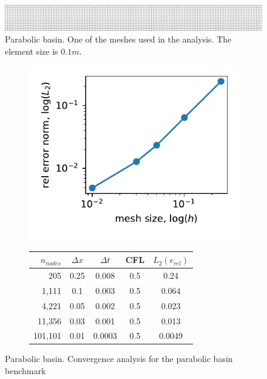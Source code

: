 \documentclass[a4paper,12pt]{article}
\begin{document}
\begin{figure}
    \includegraphics[width=\textwidth]{img/par/mesh_0.1.pdf}
    \caption{Parabolic basin. One of the meshes used in the analysis. The element size is $0.1m$.}
    \label{parabola_mesh}
\end{figure}

\begin{figure}[H]
\begin{subfigure}{0.4\textwidth}
    \includegraphics[width=\textwidth]{img/par/conv_1.pdf}    
\end{subfigure}
\hfill
\begin{subfigure}{0.58\textwidth}
    \begin{tabular}{>{\small}rcccc} \hline
    $n_{nodes}$ & $\Delta x$ & $\Delta t$ & CFL & $L_2(e_{rel})$ \\ \hline
205 & 0.25 & 0.008 & 0.5 & 0.24 \\
1,111 & 0.1 & 0.003 & 0.5 & 0.064 \\
4,221 & 0.05 & 0.002 & 0.5 & 0.023 \\
11,356 & 0.03 & 0.001 & 0.5 & 0.013 \\
101,101 & 0.01 & 0.0003 & 0.5 & 0.0049 \\
    \hline
    \end{tabular}
\end{subfigure}
\caption{Parabolic basin. Convergence analysis for the parabolic basin benchmark}
\label{parabola_convergence}
\end{figure}
\end{document}
